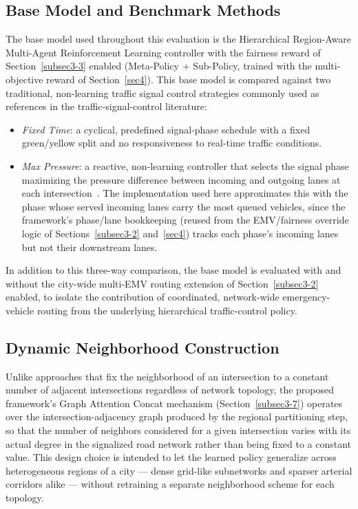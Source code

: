 \documentclass[3p,times]{elsarticle}
\theoremstyle{plain}
\theoremstyle{definition}
\begin{document}
\subsection{Base Model and Benchmark Methods}\label{subsec5-2}

The base model used throughout this evaluation is the Hierarchical
Region-Aware Multi-Agent Reinforcement Learning controller with the
fairness reward of Section~\ref{subsec3-3} enabled (Meta-Policy +
Sub-Policy, trained with the multi-objective reward of
Section~\ref{sec4}). This base model is compared against two
traditional, non-learning traffic signal control strategies commonly
used as references in the traffic-signal-control literature:

\begin{itemize}
\item \textit{Fixed Time}: a cyclical, predefined signal-phase schedule
with a fixed green/yellow split and no responsiveness to real-time
traffic conditions.
\item \textit{Max Pressure}: a reactive, non-learning controller that
selects the signal phase maximizing the pressure difference between
incoming and outgoing lanes at each intersection~\cite{maxpressure}.
The implementation used here approximates this with the phase whose
served incoming lanes carry the most queued vehicles, since the
framework's phase/lane bookkeeping (reused from the EMV/fairness
override logic of Sections~\ref{subsec3-2} and~\ref{sec4}) tracks each
phase's incoming lanes but not their downstream lanes.
\end{itemize}

In addition to this three-way comparison, the base model is evaluated
with and without the city-wide multi-EMV routing extension of
Section~\ref{subsec3-2} enabled, to isolate the contribution of
coordinated, network-wide emergency-vehicle routing from the
underlying hierarchical traffic-control policy.

\subsection{Dynamic Neighborhood Construction}\label{subsec5-3}

Unlike approaches that fix the neighborhood of an intersection to a
constant number of adjacent intersections regardless of network
topology, the proposed framework's Graph Attention Concat mechanism
(Section~\ref{subsec3-7}) operates over the intersection-adjacency
graph produced by the regional partitioning step, so that the number
of neighbors considered for a given intersection varies with its
actual degree in the signalized road network rather than being fixed
to a constant value. This design choice is intended to let the learned
policy generalize across heterogeneous regions of a city --- dense
grid-like subnetworks and sparser arterial corridors alike --- without
retraining a separate neighborhood scheme for each topology.
\end{document}

